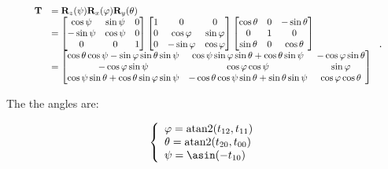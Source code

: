     \begin{equation}
        \scalebox{0.85}{
            $ \begin{array}{ll}
                \mathbf{T}
                &= \mathbf{R}_{z}(\psi)\mathbf{R}_{x}(\varphi)\mathbf{R}_{y}(\theta) \\
                &=
                \begin{bmatrix}
                    \cos \psi & \sin \psi & 0 \\
                    -\sin \psi & \cos \psi & 0 \\
                    0 & 0 & 1
                \end{bmatrix}
                \begin{bmatrix}
                    1 & 0 & 0 \\
                    0 & \cos \varphi & \sin \varphi \\
                    0 & -\sin \varphi & \cos \varphi
                \end{bmatrix}
                \begin{bmatrix}
                    \cos \theta & 0 & -\sin \theta \\
                    0 & 1 & 0 \\
                    \sin \theta & 0 & \cos \theta
                \end{bmatrix} \\
                &=
                \begin{bmatrix}
                    \cos \theta \cos \psi - \sin \varphi \sin \theta \sin \psi
                    &  \cos \psi \sin \varphi \sin \theta + \cos \theta \sin \psi
                    & -\cos \varphi \sin \theta \\
                    -\cos \varphi \sin \psi
                    & \cos \varphi \cos \psi
                    & \sin \varphi \\
                    \cos \psi \sin \theta + \cos \theta \sin \varphi \sin \psi
                    & -\cos \theta \cos \psi \sin \theta + \sin \theta \sin \psi
                    & \cos \varphi \cos \theta
                \end{bmatrix}
            \end{array} $
        }
    .\end{equation}

    The the angles are:

    \begin{equation}
        \left\{ \begin{array}{l}
            \varphi = \atantwo(t_{12}, t_{11}) \\
            \theta = \atantwo(t_{20}, t_{00}) \\
            \psi = \asin(-t_{10})
        \end{array} \right.
    \end{equation}

